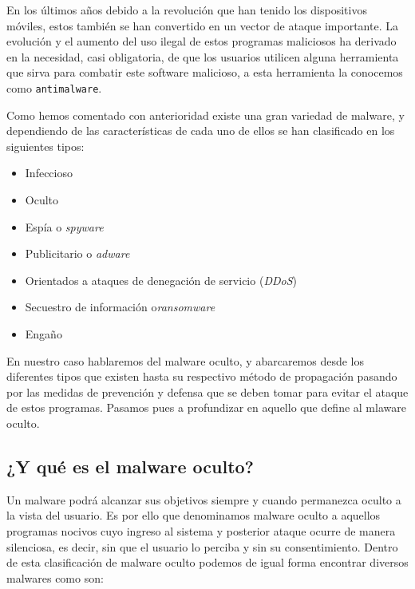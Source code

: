 \documentclass[12pt]{article}
\newcommand{\newpar} {
    \vskip 1cm
}
\begin{document}
        \newpar

        En los últimos años debido a la revolución que han tenido los dispositivos móviles, estos también se han convertido en un vector de ataque importante. La evolución y el aumento del uso ilegal de estos programas maliciosos ha derivado en la necesidad, casi obligatoria, de que los usuarios utilicen alguna herramienta que sirva para combatir este software malicioso, a esta herramienta la conocemos como \texttt{antimalware}.

        \newpar

        Como hemos comentado con anterioridad existe una gran variedad de malware, y dependiendo de las características de cada uno de ellos se han clasificado en los siguientes tipos:
        
        \begin{itemize}
            \item Infeccioso
            \item Oculto
            \item Espía o \textit{spyware}
            \item Publicitario o \textit{adware}
            \item Orientados a ataques de denegación de servicio (\textit{DDoS})
            \item Secuestro de información o\textit{ransomware}
            \item Engaño 
        \end{itemize}

        \newpar

        En nuestro caso hablaremos del malware oculto, y abarcaremos desde los diferentes tipos que existen hasta su respectivo método de propagación pasando por las medidas de prevención y defensa que se deben tomar para evitar el ataque de estos programas. Pasamos pues a profundizar en aquello que define al mlaware oculto.

        \subsection{¿Y qué es el malware oculto?}
            Un malware podrá alcanzar sus objetivos siempre y cuando permanezca oculto a la vista del usuario. Es por ello que denominamos malware oculto a aquellos programas nocivos cuyo ingreso al sistema y posterior ataque ocurre de manera silenciosa, es decir, sin que el usuario lo perciba y sin su consentimiento. Dentro de esta clasificación de malware oculto podemos de igual forma encontrar diversos malwares como son:
\end{document}
